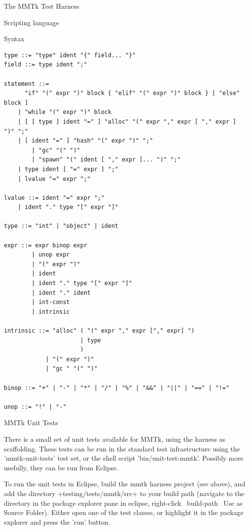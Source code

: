\begin{chapter}{The MMTk Test Harness}
\begin{section}{Scripting language}
\begin{subsection}{Syntax}
\begin{lstlisting}
type ::= "type" ident "{" field... "}"
field ::= type ident ";"

statement ::=
	  "if" "(" expr ")" block { "elif" "(" expr ")" block } [ "else" block ]
	| "while "(" expr ")" block
	| [ [ type ] ident "=" ] "alloc" "(" expr "," expr [ "," expr ] ")" ";"
	| [ ident "=" ] "hash" "(" expr ")" ";"
        | "gc" "(" ")"
        | "spawn" "(" ident [ "," expr ]... ")" ";"
	| type ident [ "=" expr ] ";"
	| lvalue "=" expr ";"

lvalue ::= ident "=" expr ";"
	| ident "." type "[" expr "]"

type ::= "int" | "object" | ident

expr ::= expr binop expr
		| unop expr
		| "(" expr ")"
		| ident
		| ident "." type "[" expr "]"
		| ident "." ident
		| int-const
		| intrinsic

intrinsic ::= "alloc" ( "(" expr "," expr ["," expr] ")
                      | type
                      )
            | "(" expr ")"
            | "gc " "(" ")"

binop ::= "+" | "-" | "*" | "/" | "%" | "&&" | "||" | "==" | "!="

unop ::= "!" | "-"
\end{lstlisting}

\end{subsection}

\end{section}

\begin{section}{MMTk Unit Tests}

There is a small set of unit tests available for MMTk, using the harness as scaffolding.  These tests can be run in the standard test infrastructure using the 'mmtk-unit-tests' test set, or the shell script 'bin/unit-test-mmtk'.  Possibly more usefully, they can be run from Eclipse.

To run the unit tests in Eclipse, build the mmtk harness project (see above), and add the directory \spverb+testing/tests/mmtk/src+ to your build path (navigate to the directory in the package explorer pane in eclipse, right-click \textrightarrow\ build-path \textrightarrow\ Use as Source Folder).  Either open one of the test classes, or highlight it in the package explorer and press the 'run' button.

\end{section}

\end{chapter}
